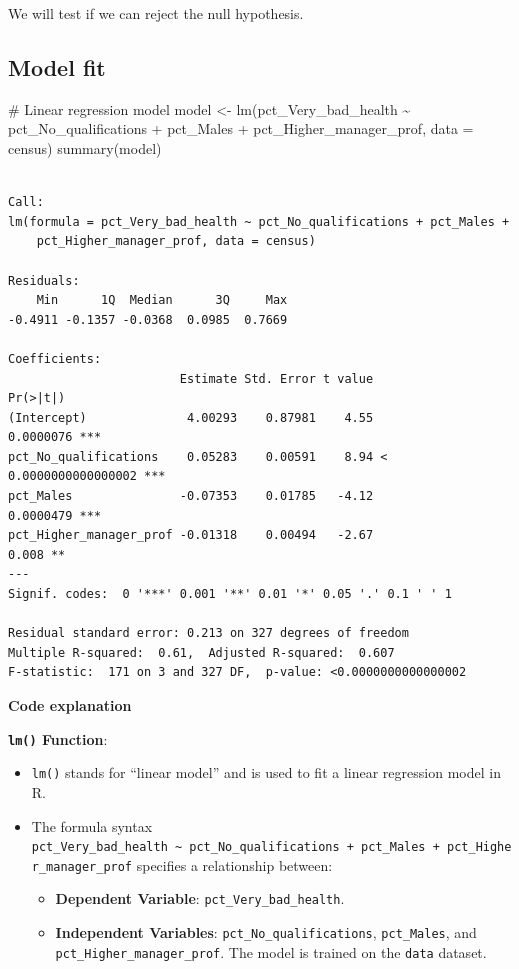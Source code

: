 \documentclass[
  letterpaper,
  DIV=11,
  numbers=noendperiod]{scrreprt}
\newenvironment{Shaded}{\begin{snugshade}}{\end{snugshade}}
\newcommand{\AttributeTok}[1]{\textcolor[rgb]{0.40,0.45,0.13}{#1}}
\newcommand{\CommentTok}[1]{\textcolor[rgb]{0.37,0.37,0.37}{#1}}
\newcommand{\FunctionTok}[1]{\textcolor[rgb]{0.28,0.35,0.67}{#1}}
\newcommand{\NormalTok}[1]{\textcolor[rgb]{0.00,0.23,0.31}{#1}}
\newcommand{\OtherTok}[1]{\textcolor[rgb]{0.00,0.23,0.31}{#1}}
\newcommand{\SpecialCharTok}[1]{\textcolor[rgb]{0.37,0.37,0.37}{#1}}
\providecommand{\tightlist}{%
  \setlength{\itemsep}{0pt}\setlength{\parskip}{0pt}}\usepackage{longtable,booktabs,array}
\begin{document}
We will test if we can reject the null hypothesis.

\subsection{Model fit}\label{model-fit}

\begin{Shaded}
\begin{Highlighting}[]
\CommentTok{\# Linear regression model}
\NormalTok{model }\OtherTok{\textless{}{-}} \FunctionTok{lm}\NormalTok{(pct\_Very\_bad\_health }\SpecialCharTok{\textasciitilde{}}\NormalTok{ pct\_No\_qualifications }\SpecialCharTok{+}\NormalTok{ pct\_Males }\SpecialCharTok{+}\NormalTok{ pct\_Higher\_manager\_prof, }\AttributeTok{data =}\NormalTok{ census)}
\FunctionTok{summary}\NormalTok{(model)}
\end{Highlighting}
\end{Shaded}

\begin{verbatim}

Call:
lm(formula = pct_Very_bad_health ~ pct_No_qualifications + pct_Males + 
    pct_Higher_manager_prof, data = census)

Residuals:
    Min      1Q  Median      3Q     Max 
-0.4911 -0.1357 -0.0368  0.0985  0.7669 

Coefficients:
                        Estimate Std. Error t value             Pr(>|t|)    
(Intercept)              4.00293    0.87981    4.55            0.0000076 ***
pct_No_qualifications    0.05283    0.00591    8.94 < 0.0000000000000002 ***
pct_Males               -0.07353    0.01785   -4.12            0.0000479 ***
pct_Higher_manager_prof -0.01318    0.00494   -2.67                0.008 ** 
---
Signif. codes:  0 '***' 0.001 '**' 0.01 '*' 0.05 '.' 0.1 ' ' 1

Residual standard error: 0.213 on 327 degrees of freedom
Multiple R-squared:  0.61,  Adjusted R-squared:  0.607 
F-statistic:  171 on 3 and 327 DF,  p-value: <0.0000000000000002
\end{verbatim}

\textbf{Code explanation}

\textbf{\texttt{lm()} Function}:

\begin{itemize}
\tightlist
\item
  \texttt{lm()} stands for ``linear model'' and is used to fit a linear
  regression model in R.
\item
  The formula syntax
  \texttt{pct\_Very\_bad\_health\ \textasciitilde{}\ pct\_No\_qualifications\ +\ pct\_Males\ +\ pct\_Higher\_manager\_prof}
  specifies a relationship between:

  \begin{itemize}
  \tightlist
  \item
    \textbf{Dependent Variable}: \texttt{pct\_Very\_bad\_health}.
  \item
    \textbf{Independent Variables}: \texttt{pct\_No\_qualifications},
    \texttt{pct\_Males}, and \texttt{pct\_Higher\_manager\_prof}. The
    model is trained on the \texttt{data} dataset.
  \end{itemize}
\end{itemize}
\end{document}
